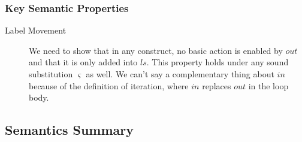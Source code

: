 \subsubsection{Key Semantic Properties}

\begin{description}
  \item[Label Movement]
    We need to show that in any construct,
    no basic action is enabled by $out$
    and that it is only added into $ls$.
    This property holds under any sound substitution $\varsigma$ as well.
    We can't say a complementary thing about $in$ because of the definition
    of iteration, where $in$ replaces $out$ in the loop body.
\end{description}

\subsection{Semantics Summary}\label{ssec:sem-summary}

